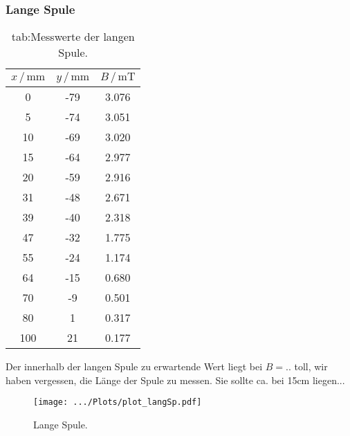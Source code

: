     \subsubsection{Lange Spule}
    \begin{table}
    \centering
    \caption{tab:Messwerte der langen Spule.}
    \label{tab:langSp}
        \begin{tabular}{S[table-format=3.0] S[table-format=2.0] S[table-format=2.2]}
            \toprule
            {$x\,/\,\mathrm{mm}$} & {$y\,/\,\mathrm{mm}$} & {$B\,/\,\mathrm{mT}$}\\
               & -79   & 3.076 \\
            5   & -74   & 3.051 \\
            10  & -69   & 3.020 \\
            15  & -64   & 2.977 \\
            20  & -59   & 2.916 \\
            31  & -48   & 2.671 \\
            39  & -40   & 2.318 \\
            47  & -32   & 1.775 \\
            55  & -24   & 1.174 \\
            64  & -15   & 0.680 \\
            70  & -9    & 0.501 \\
            80  & 1     & 0.317 \\
            100 & 21    & 0.177 \\
            \bottomrule
        \end{tabular}
    \end{table}
    Der innerhalb der langen Spule zu erwartende Wert liegt bei $B=$.. toll, wir haben vergessen, die Länge der Spule zu messen.
    Sie sollte ca. bei 15cm liegen... 
    \begin{figure}
        \centering
        \texttt{[image: .../Plots/plot\_langSp.pdf]}
        \caption{Lange Spule.}
        \label{fig:lang}
    \end{figure}